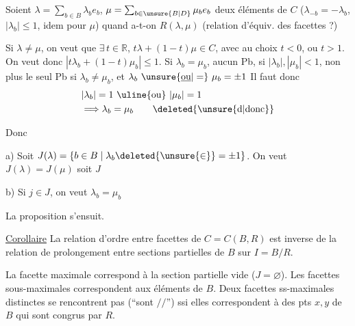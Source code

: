 Soient $\lambda=\sum_{b\in B}\lambda_b e_b$, $\mu=\sum_{b\in\unsure{B|D}}\mu_b e_b$ deux éléments de $C$
($\lambda_{-b}=-\lambda_b$, $|\lambda_b|\leq 1$, idem pour $\mu$) quand a-t-on
$R(\lambda,\mu)$ (relation d'équiv. des facettes ?)

Si $\lambda\ne\mu$, on veut que  $\exists\,t\in\mathbb R$, $t\lambda+(1-t)\mu\in C$,
avec au choix $t<0$, ou $t>1$.  On veut
 donc $|t\lambda_b+(1-t)\mu_b|\leq1$. Si $\lambda_b=\mu_b$,
aucun Pb, si $|\lambda_b|,|\mu_b|<1$, non plus
le seul Pb si $\lambda_b\ne\mu_b$, et $\lambda_b\ \unsure{\underline{\text{ou}}|=}\ \mu_b=\pm1$
Il faut donc
\[
\begin{aligned}
&|\lambda_b|=1\ \text{\uline{ou}}\ |\mu_b|=1\\
&\Longrightarrow\lambda_b=\mu_b\qquad\deleted{\unsure{\text{d}|\text{donc}}}
\end{aligned}
\]

Donc 

a) Soit $J(\lambda)=\{b\in B\mid\lambda_b\deleted{\unsure{\in}}=\pm1\}$. On veut $J(\lambda)=J(\mu)$ soit $J$

b) Si $j\in J$, on veut $\lambda_b=\mu_b$

La proposition s'ensuit.

\uline{Corollaire} La relation d'ordre entre facettes
de $C=C(B,R)$ est inverse de la relation de
prolongement entre sections partielles de
$B$ sur $I=B/R$.

La facette maximale correspond à la section
partielle vide ($J=\varnothing$). Les facettes sous-maximales correspondent aux éléments de $B$.
Deux facettes ss-maximales distinctes  se rencontrent
pas (``sont $//$'') ssi elles correspondent à des pts
$x,y$ de $B$ qui sont congrus par $R$.
